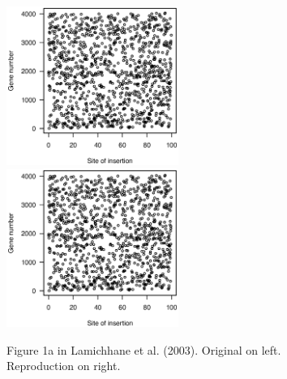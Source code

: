 \begin{figure}
\includegraphics[viewport=133 224 464 528, width=0.50\textwidth]{../original/Nov02/R/Figs/fig1.ps}
\hfill
\includegraphics[viewport=133 224 464 528, width=0.50\textwidth]{../reproduction/Figs/fig1.ps}

\caption{Figure 1a in Lamichhane et al. (2003). Original on left. Reproduction on right.\label{fig:fig1a}}
\end{figure}

